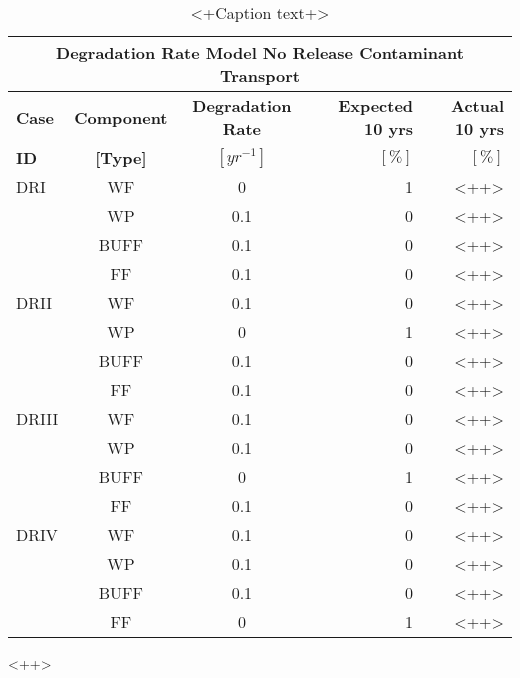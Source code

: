 
\begin{table}
\centering
\footnotesize{
\begin{tabularx}{\textwidth}{|X|c|c|r|r|}
  \multicolumn{5}{c}{\textbf{Degradation Rate Model No Release Contaminant Transport}}\\
  \hline
  \textbf{Case}  &  \textbf{Component} &  \textbf{Degradation Rate} & \textbf{Expected 10 yrs} & \textbf{Actual 10 yrs}\\
  \textbf{ID}    & \textbf{[Type]} &  \textbf{$[yr^{-1}]$}  &  $[\%]$  & $[\%]$\\
  \hline
  DRI     &  WF    &  0   & 1 & <++>\\
          &  WP    &  0.1 & 0 & <++>\\
          &  BUFF  &  0.1 & 0 & <++>\\
          &  FF    &  0.1 & 0 & <++>\\
  \hline
  DRII    &  WF    &  0.1 & 0 & <++>\\
          &  WP    &  0   & 1 & <++>\\
          &  BUFF  &  0.1 & 0 & <++>\\
          &  FF    &  0.1 & 0 & <++>\\
  \hline
  DRIII   &  WF    &  0.1 & 0 & <++>\\
          &  WP    &  0.1 & 0 & <++>\\
          &  BUFF  &  0   & 1 & <++>\\
          &  FF    &  0.1 & 0 & <++>\\
  \hline
  DRIV    &  WF    &  0.1 & 0 & <++>\\
          &  WP    &  0.1 & 0 & <++>\\
          &  BUFF  &  0.1 & 0 & <++>\\
          &  FF    &  0   & 1 & <++>\\
  \hline
\end{tabularx}
\caption{<+Caption text+>}
\label{tab:<+label+>}
}
\end{table}<++>
